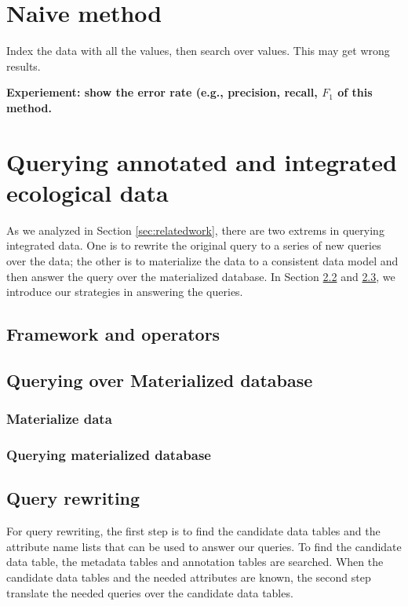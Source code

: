 \documentclass[conference]{IEEEtran}
\begin{document}
\section{Naive method}\label{sec:naive}
Index the data with all the values, then search over values. 
This may get wrong results. 

{\bf Experiement: show the error rate (e.g., precision, recall, $F_1$ of this method.}

\section{Querying annotated and integrated ecological data}

As we analyzed in Section \ref{sec:relatedwork}, there are two extrems
in querying integrated data. 
One is to rewrite the original query to a series of new queries over
the data; the other is to materialize the data to a consistent data
model and then answer the query over the materialized database. 
In Section \ref{sec:matdb} and \ref{sec:queryrewrite}, we introduce
our strategies in answering the queries. 

\subsection{Framework and operators}


\subsection{Querying over Materialized database}\label{sec:matdb}

\subsubsection{Materialize data}

\subsubsection{Querying materialized database}



\subsection{Query rewriting}\label{sec:queryrewrite}

For query rewriting, the first step is to find the candidate data
tables and the attribute name lists that can be used to answer our queries. 
To find the candidate data table, the metadata tables and annotation
tables are searched. 
When the candidate data tables and the needed attributes are known, 
the second step translate the needed queries over the candidate data
tables.   
\end{document}
